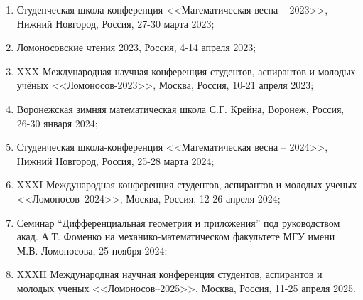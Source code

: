\begin{enumerate}%
\item Студенческая школа-конференция <<Математическая весна --  2023>>, Нижний Новгород, Россия, 27-30 марта 2023;

\item Ломоносовские чтения 2023, Россия, 4-14 апреля 2023;

\item XXX Международная научная конференция студентов, аспирантов и молодых учёных <<Ломоносов-2023>>,  Москва, Россия, 10-21 апреля 2023;

\item Воронежская зимняя математическая школа С.Г. Крейна, Воронеж, Россия, 26-30 января 2024;

\item Студенческая школа-конференция <<Математическая весна -- 2024>>, Нижний Новгород, Россия, 25-28 марта 2024;

\item XXXI Международная конференция студентов, аспирантов и молодых ученых <<Ломоносов--2024>>, Москва, Россия, 12-26 апреля 2024;

\item Семинар “Дифференциальная геометрия и приложения” под руководством акад. А.Т. Фоменко на механико-математическом факультете МГУ имени М.В. Ломоносова, 25 ноября 2024;


\item XXXII Международная научная конференция студентов, аспирантов и молодых ученых <<Ломоносов--2025>>, Москва, Россия, 11-25 апреля 2025.
\end{enumerate}

